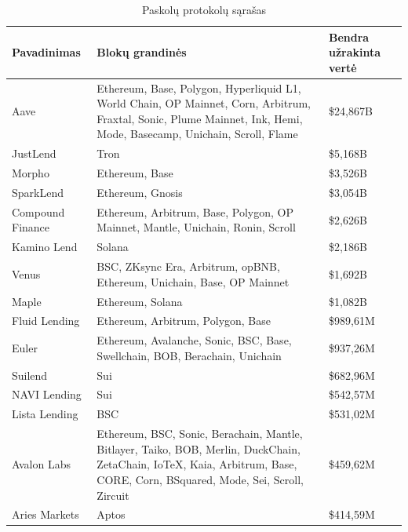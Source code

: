 \documentclass[]{VUMIFTemplateClass}
\begin{document}
\begin{table}[H]
  \centering
  \caption{Paskolų protokolų sąrašas \cite{LikvidacijuProtokolai}}
  \begin{tabular}{|l|p{7cm}|p{5cm}|}
  \hline
  \textbf{Pavadinimas} & \textbf{Blokų grandinės} & \textbf{Bendra užrakinta vertė} \\ \hline
  Aave                      & Ethereum, Base, Polygon, Hyperliquid L1, World Chain, OP Mainnet, Corn, Arbitrum, Fraxtal, Sonic, Plume Mainnet, Ink, Hemi, Mode, Basecamp, Unichain, Scroll, Flame & \$24,867B \\ \hline
  JustLend                  & Tron                                                & \$5,168B  \\ \hline
  Morpho                    & Ethereum, Base                                      & \$3,526B  \\ \hline
  SparkLend                 & Ethereum, Gnosis                                    & \$3,054B  \\ \hline
  Compound Finance          & Ethereum, Arbitrum, Base, Polygon, OP Mainnet, Mantle, Unichain, Ronin, Scroll & \$2,626B  \\ \hline
  Kamino Lend               & Solana                                              & \$2,186B  \\ \hline
  Venus                     & BSC, ZKsync Era, Arbitrum, opBNB, Ethereum, Unichain, Base, OP Mainnet          & \$1,692B  \\ \hline
  Maple                     & Ethereum, Solana          & \$1,082B  \\ \hline
  Fluid Lending             & Ethereum, Arbitrum, Polygon, Base                            & \$989,61M \\ \hline
  Euler                     & Ethereum, Avalanche, Sonic, BSC, Base, Swellchain, BOB, Berachain, Unichain          & \$937,26M  \\ \hline
  Suilend                   & Sui                                                 & \$682,96M \\ \hline
  NAVI Lending              & Sui                                                 & \$542,57M \\ \hline
  Lista Lending                     & BSC          & \$531,02M  \\ \hline
  Avalon Labs               & Ethereum, BSC, Sonic, Berachain, Mantle, Bitlayer, Taiko, BOB, Merlin, DuckChain, ZetaChain, IoTeX, Kaia, Arbitrum, Base, CORE, Corn, BSquared, Mode, Sei, Scroll, Zircuit & \$459,62M  \\ \hline
  Aries Markets                     & Aptos          & \$414,59M  \\ \hline
  \end{tabular}
  \label{tab:sample_table}
\end{table}
\end{document}
